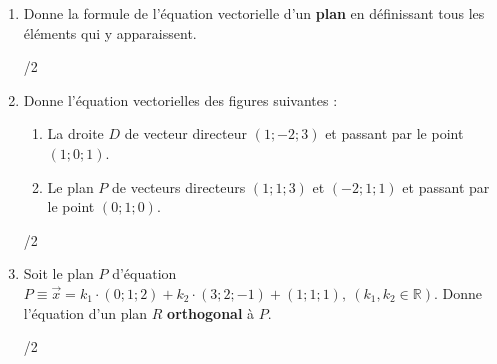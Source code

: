 	\begin{enumerate}
		\item 
			\begin{minipage}[t]{.9\textwidth}
				Donne la formule de l'équation vectorielle d'un \textbf{plan} en définissant tous les éléments qui y apparaissent.
			\end{minipage}%
			\begin{minipage}{.1\textwidth}
				\begin{flushright}
					{\large /2}
				\end{flushright}
			\end{minipage}
			\vspace{3em}
			
		\item 
			\begin{minipage}[t]{.9\textwidth}
				Donne l'équation vectorielles des figures suivantes :
				\begin{enumerate}
					\item La droite $D$ de vecteur directeur $\left(1; -2; 3 \right)$ et passant par le point $\left(1; 0; 1\right)$.
					\item Le plan $P$ de vecteurs directeurs $\left(1; 1; 3\right)$ et $\left(-2; 1; 1\right)$ et passant par le point $\left(0; 1; 0\right)$.
				\end{enumerate}
			\end{minipage}%
			\begin{minipage}{.1\textwidth}
				\begin{flushright}
					{\large /2}
				\end{flushright}
			\end{minipage}
			\vspace{3em}
			
		\item 
			\begin{minipage}[t]{.9\textwidth}
				Soit le plan $P$ d'équation $P \equiv \vec{x} = k_1 \cdot \left(0; 1; 2\right) + k_2 \cdot\left(3; 2; -1\right) + \left(1; 1; 1\right), ~(k_1, k_2 \in \mathbb{R})$. Donne l'équation d'un plan $R$ \textbf{orthogonal} à $P$.
			\end{minipage}%
			\begin{minipage}{.1\textwidth}
				\begin{flushright}
					{\large /2}
				\end{flushright}
			\end{minipage}
			\vspace{3em}
			

\end{enumerate}
